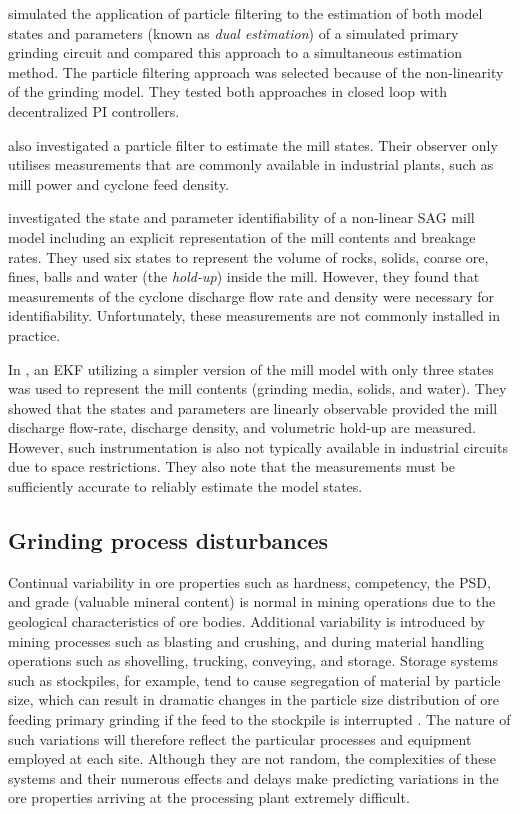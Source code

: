 \cite{olivier_dual_2012} simulated the application of particle filtering to the estimation of both model states and parameters (known as \textit{dual estimation}) of a simulated primary grinding circuit and compared this approach to a simultaneous estimation method. The particle filtering approach was selected because of the non-linearity of the grinding model. They tested both approaches in closed loop with decentralized \gls{PI} controllers.

\cite{le_roux_throughput_2016} also investigated a particle filter to estimate the mill states. Their observer only utilises measurements that are commonly available in industrial plants, such as mill power and cyclone feed density.

\cite{le_roux_state_2016} investigated the state and parameter identifiability of a non-linear \acrshort{SAG} mill model including an explicit representation of the mill contents and breakage rates. They used six states to represent the volume of rocks, solids, coarse ore, fines, balls and water (the \textit{hold-up}) inside the mill. However, they found that measurements of the cyclone discharge flow rate and density were necessary for identifiability. Unfortunately, these measurements are not commonly installed in practice.

In \cite{le_roux_ekf_2017}, an \gls{EKF} utilizing a simpler version of the mill model with only three states was used to represent the mill contents (grinding media, solids, and water). They showed that the states and parameters are linearly observable provided the mill discharge flow-rate, discharge density, and volumetric hold-up are measured. However, such instrumentation is also not typically available in industrial circuits due to space restrictions. They also note that the measurements must be sufficiently accurate to reliably estimate the model states.

\subsection{Grinding process disturbances}

Continual variability in ore properties such as hardness, competency, the \gls{PSD}, and grade (valuable mineral content) is normal in mining operations due to the geological characteristics of ore bodies. Additional variability is introduced by mining processes such as blasting and crushing, and during material handling operations such as shovelling, trucking, conveying, and storage. Storage systems such as stockpiles, for example, tend to cause segregation of material by particle size, which can result in dramatic changes in the particle size distribution of ore feeding primary grinding if the feed to the stockpile is interrupted \citep{estrada_hybrid_2014}. The nature of such variations will therefore reflect the particular processes and equipment employed at each site. Although they are not random, the complexities of these systems and their numerous effects and delays make predicting variations in the ore properties arriving at the processing plant extremely difficult.


